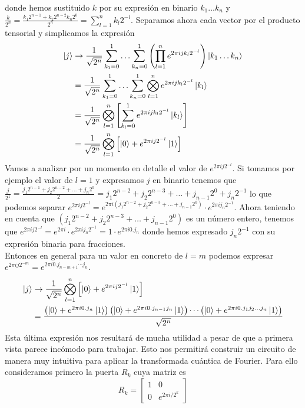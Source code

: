 \documentclass[a4paper]{article}
\numberwithin{equation}{section}
\begin{document}
donde hemos sustituido $k$ por su expresión en binario $k_1\ldots k_n$ y $\frac{k}{2^n} = \frac{k_1 2^{n-1} + k_2 2^{n-2} k_n 2^0}{2^n} = \sum_{l=1}^{n} k_l 2^{-l}$. Separamos ahora cada vector por el producto tensorial y simplicamos la expresión
\begin{equation}
\begin{split}
\ket{j} &\rightarrow
\frac{1}{\sqrt{2^n}} \sum_{k_1=0}^{1} \ldots \sum_{k_n=0}^{1} \left( \prod_{l=1}^{n} e^{2\pi i j k_l 2^{-l}} \right) \ket{k_1\ldots k_n}
\\ &=
\frac{1}{\sqrt{2^n}} \sum_{k_1=0}^{1} \ldots \sum_{k_n=0}^{1} \bigotimes_{l=1}^{n} e^{2\pi i j k_l 2^{-l}} \ket{k_l}
\\ &=
\frac{1}{\sqrt{2^n}} \bigotimes_{l=1}^{n} \left[ \sum_{k_l=0}^{1} e^{2\pi i j k_l 2^{-l}} \ket{k_l} \right]
\\ &=
\frac{1}{\sqrt{2^n}} \bigotimes_{l=1}^{n} \left[ \ket{0} + e^{2\pi i j 2^{-l}} \ket{1} \right]
\end{split}
\end{equation}
Vamos a analizar por un momento en detalle el valor de $e^{2\pi i j 2^{-l}}$. Si tomamos por ejemplo el valor de $l=1$ y expresamos $j$ en binario tenemos que $\frac{j}{2^1} = \frac{j_1 2^{n-1} + j_2 2^{n-2} + \ldots + j_n 2^{0}}{2} = j_1 2^{n-2} + j_2 2^{n-3} + \ldots + j_{n-1} 2^{0} + j_n 2^{-1}$ lo que podemos separar $e^{2\pi i j 2^{-l}} = e^{2\pi i \left( j_1 2^{n-2} + j_2 2^{n-3} + \ldots + j_{n-1} 2^{0} \right)} \cdot e^{2\pi i j_n 2^{-1}}$. Ahora teniendo en cuenta que $\left( j_1 2^{n-2} + j_2 2^{n-3} + \ldots + j_{n-1} 2^{0} \right)$ es un número entero, tenemos que $e^{2\pi i j 2^{-l}} = e^{2\pi i} \cdot e^{2\pi i j_n 2^{-1}} = 1 \cdot e^{2\pi i 0.j_n}$ donde hemos expresado $j_n 2^{-1}$ con su expresión binaria para fracciones.\\
Entonces en general para un valor en concreto de $l = m$ podemos expresar $e^{2\pi i j 2^{-m}} = e^{2\pi i 0.j_{n-m+1}\cdots j_{n}}$.
\begin{equation}
\begin{split}
\ket{j} &\rightarrow
\frac{1}{\sqrt{2^n}} \bigotimes_{l=1}^{n} \left[ \ket{0} + e^{2\pi i j 2^{-l}} \ket{1} \right]
\\ &=
\frac{\left( \ket{0} + e^{2\pi i 0.j_n}\ket{1} \right) \left( \ket{0} + e^{2\pi i 0.j_{n-1}j_n}\ket{1} \right) \cdots \left( \ket{0} + e^{2\pi i 0.j_1 j_2 \ldots j_n}\ket{1} \right)}{\sqrt{2^n}}
\end{split}
\end{equation}
Esta última expresión nos resultará de mucha utilidad a pesar de que a primera vista parece incómodo para trabajar. Esto nos permitirá construir un circuito de manera muy intuitiva para aplicar la transformada cuántica de Fourier. Para ello consideramos primero la puerta $R_k$ cuya matriz es
\begin{equation}
R_k =
\begin{bmatrix}
1 & 0 \\
0 & e^{2\pi i/2^k}
\end{bmatrix}
\end{equation}
\end{document}
